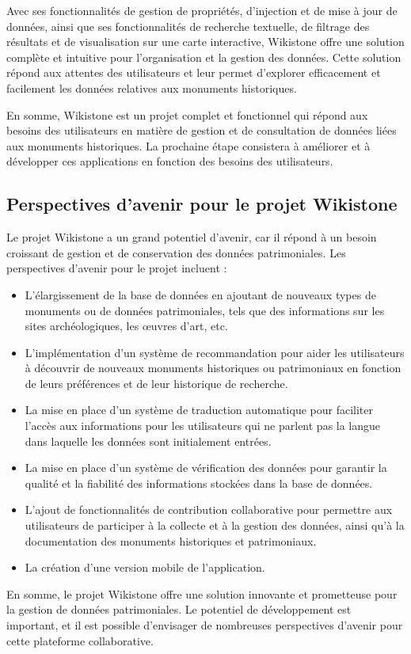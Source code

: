 \documentclass[a4paper, 12pt]{article}
\begin{document}
Avec ses fonctionnalités de gestion de propriétés, d'injection et de mise à jour de données, ainsi que ses fonctionnalités de recherche textuelle, de filtrage des résultats et de visualisation sur une carte interactive, Wikistone offre une solution complète et intuitive pour l'organisation et la gestion des données. Cette solution répond aux attentes des utilisateurs et leur permet d'explorer efficacement et facilement les données relatives aux monuments historiques.

En somme, Wikistone est un projet complet et fonctionnel qui répond aux besoins des utilisateurs en matière de gestion et de consultation de données liées aux monuments historiques. La prochaine étape consistera à améliorer et à développer ces applications en fonction des besoins des utilisateurs.

\subsection{Perspectives d'avenir pour le projet Wikistone}

Le projet Wikistone a un grand potentiel d'avenir, car il répond à un besoin croissant de gestion et de conservation des données patrimoniales. Les perspectives d'avenir pour le projet incluent :

\begin{itemize}
    \item L'élargissement de la base de données en ajoutant de nouveaux types de monuments ou de données patrimoniales, tels que des informations sur les sites archéologiques, les œuvres d'art, etc. \\
    
    \item L'implémentation d'un système de recommandation pour aider les utilisateurs à découvrir de nouveaux monuments historiques ou patrimoniaux en fonction de leurs préférences et de leur historique de recherche. \\

    \item La mise en place d'un système de traduction automatique pour faciliter l'accès aux informations pour les utilisateurs qui ne parlent pas la langue dans laquelle les données sont initialement entrées.\\
    
    \item La mise en place d'un système de vérification des données pour garantir la qualité et la fiabilité des informations stockées dans la base de données.\\

    \item L'ajout de fonctionnalités de contribution collaborative pour permettre aux utilisateurs de participer à la collecte et à la gestion des données, ainsi qu'à la documentation des monuments historiques et patrimoniaux. \\
    
    \item La création d'une version mobile de l'application.
\end{itemize}

En somme, le projet Wikistone offre une solution innovante et prometteuse pour la gestion de données patrimoniales. Le potentiel de développement est important, et il est possible d'envisager de nombreuses perspectives d'avenir pour cette plateforme collaborative.
\end{document}
